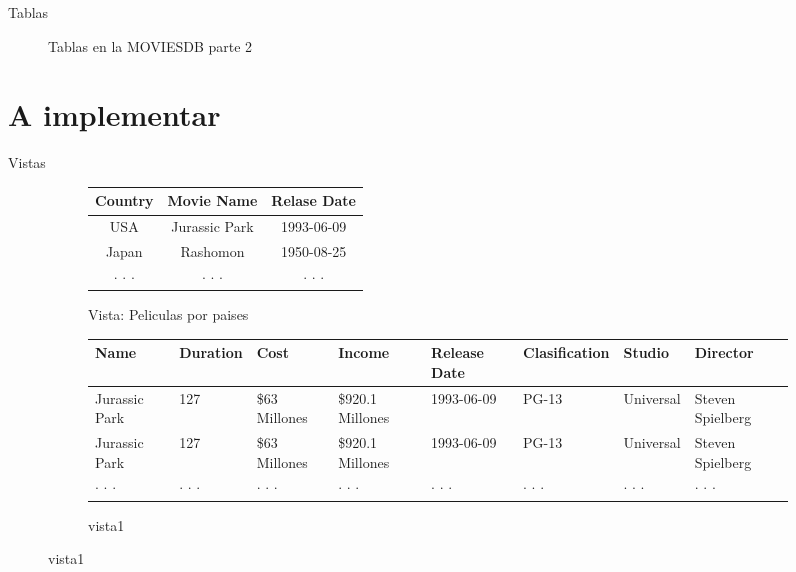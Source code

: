 \documentclass{beamer}%
\begin{document}
\begin{frame}{Tablas}
\begin{figure}
\begin{subfigure}[b]{0.3\textwidth}
    \end{subfigure}
    \caption{Tablas en la MOVIESDB parte 2}
\end{figure}
\end{frame}

\section{A implementar}
\begin{frame}{Vistas}
	\begin{figure}

		\begin{subfigure}[b]{1\textwidth}
			\begin{tabular}{|c|c|c|}\hline
				Country		&		Movie Name		&		Relase Date \\ \hline
				USA			&		Jurassic Park	&		1993-06-09	\\	\hline
				Japan		&		Rashomon		&		1950-08-25	\\	\hline
				$\cdot$ $\cdot$ $\cdot$		&	$\cdot$ $\cdot$ $\cdot$		& $\cdot$ $\cdot$ $\cdot$ \\ \hline
			\end{tabular}
			\caption{Vista: Peliculas por paises}
		\end{subfigure}
		
		\begin{subfigure}[b]{1\textwidth}
		\begin{scriptsize}
			\begin{tabular}{|p{0.1\textwidth}|p{}|p{}|p{}|p{}|p{}|p{}|p{}|}\hline


	Name	&	Duration	&	Cost	&	Income	&	Release Date	&	Clasification	&	Studio	&	Director	\\ \hline
Jurassic Park & 127 & \$63 Millones & \$920.1 Millones & 1993-06-09 &	PG-13 & Universal & Steven Spielberg\\ \hline
Jurassic Park & 127 & \$63 Millones & \$920.1 Millones & 1993-06-09 &	PG-13 & Universal & Steven Spielberg\\ \hline
$\cdot$ $\cdot$ $\cdot$		&	$\cdot$ $\cdot$ $\cdot$		& $\cdot$ $\cdot$ $\cdot$  &$\cdot$ $\cdot$ $\cdot$		&	$\cdot$ $\cdot$ $\cdot$		& $\cdot$ $\cdot$ $\cdot$ &$\cdot$ $\cdot$ $\cdot$		&	$\cdot$ $\cdot$ $\cdot$	\\ \hline
			\end{tabular}
		\end{scriptsize}
			\caption{vista1}
		\end{subfigure}		
	\end{figure}
	
\end{frame}
\end{document}
